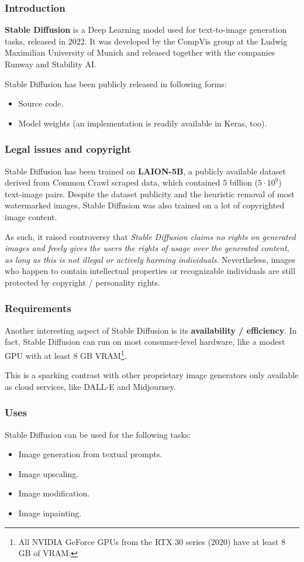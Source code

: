 \begin{frame}
    \frametitle{Introduction}
    \textbf{Stable Diffusion} is a Deep Learning model used for text-to-image generation tasks, released in 2022. It was developed by the CompVis group at the Ludwig Maximilian University of Munich and released together with the companies Runway and Stability AI.

    Stable Diffusion has been publicly released in following forms:
    \begin{itemize}
        \item Source code.
        \item Model weights (an implementation is readily available in Keras, too).
    \end{itemize}
\end{frame}

\begin{frame}
    \frametitle{Legal issues and copyright}
    Stable Diffusion has been trained on \textbf{LAION-5B}, a publicly available dataset derived from Common Crawl scraped data, which contained 5 billion ($5\cdot 10^9$) text-image pairs.
    Despite the dataset publicity and the heuristic removal of most watermarked images, Stable Diffusion was also trained on a lot of copyrighted image content.

    As such, it raised controversy that \emph{Stable Diffusion claims no rights on generated images and freely gives the users the rights of usage over the generated content, as long as this is not illegal or actively harming individuals}. Nevertheless, images who happen to contain intellectual properties or recognizable individuals are still protected by copyright / personality rights.
\end{frame}

\begin{frame}
    \frametitle{Requirements}
    Another interesting aspect of Stable Diffusion is its \textbf{availability / efficiency}. In fact, Stable Diffusion can run on most consumer-level hardware, like a modest GPU with at least 8 GB VRAM\footnote{All NVIDIA GeForce GPUs from the RTX 30 series (2020) have at least 8 GB of VRAM.}.
    
    This is a sparking contrast with other proprietary image generators only available as cloud services, like DALL-E and Midjourney.
\end{frame}

\begin{frame}
    \frametitle{Uses}
    Stable Diffusion can be used for the following tasks:
    \begin{itemize}
        \item Image generation from textual prompts.
        \item Image upscaling.
        \item Image modification.
        \item Image inpainting.
    \end{itemize}
\end{frame}


